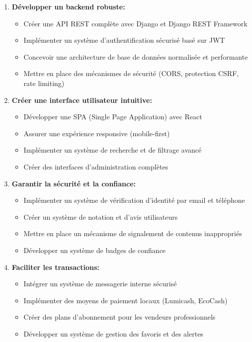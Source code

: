 \documentclass[12pt,a4paper]{report}
\begin{document}
\begin{enumerate}
    \item \textbf{Développer un backend robuste:}
    \begin{itemize}
        \item Créer une API REST complète avec Django et Django REST Framework
        \item Implémenter un système d'authentification sécurisé basé sur JWT
        \item Concevoir une architecture de base de données normalisée et performante
        \item Mettre en place des mécanismes de sécurité (CORS, protection CSRF, rate limiting)
    \end{itemize}

    \item \textbf{Créer une interface utilisateur intuitive:}
    \begin{itemize}
        \item Développer une SPA (Single Page Application) avec React
        \item Assurer une expérience responsive (mobile-first)
        \item Implémenter un système de recherche et de filtrage avancé
        \item Créer des interfaces d'administration complètes
    \end{itemize}

    \item \textbf{Garantir la sécurité et la confiance:}
    \begin{itemize}
        \item Implémenter un système de vérification d'identité par email et téléphone
        \item Créer un système de notation et d'avis utilisateurs
        \item Mettre en place un mécanisme de signalement de contenus inappropriés
        \item Développer un système de badges de confiance
    \end{itemize}

    \item \textbf{Faciliter les transactions:}
    \begin{itemize}
        \item Intégrer un système de messagerie interne sécurisé
        \item Implémenter des moyens de paiement locaux (Lumicash, EcoCash)
        \item Créer des plans d'abonnement pour les vendeurs professionnels
        \item Développer un système de gestion des favoris et des alertes
    \end{itemize}


\end{enumerate}
\end{document}
